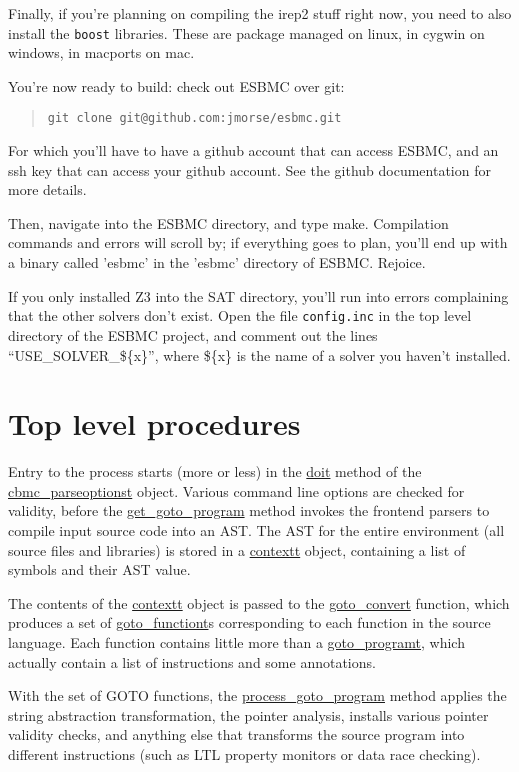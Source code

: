 \documentclass{article}
\begin{document}
Finally, if you're planning on compiling the irep2 stuff right now, you need
to also install the \texttt{boost} libraries. These are package managed on
linux, in cygwin on windows, in macports on mac.

You're now ready to build: check out ESBMC over git:

\begin{quote}
\texttt{git clone git@github.com:jmorse/esbmc.git}
\end{quote}

For which you'll have to have a github account that can access ESBMC, and an
ssh key that can access your github account. See the github documentation for
more details.

Then, navigate into the ESBMC directory, and type make. Compilation
commands and errors will scroll by; if everything goes to plan, you'll end up
with a binary called 'esbmc' in the 'esbmc' directory of ESBMC. Rejoice.

If you only installed Z3 into the SAT directory, you'll run into errors
complaining that the other solvers don't exist. Open the file
\texttt{config.inc} in the top level directory of the ESBMC project, and
comment out the lines ``USE\_SOLVER\_\$\{x\}'', where \$\{x\} is the name of
a solver you haven't installed.

\section{Top level procedures}

Entry to the process starts (more or less) in the \url{doit} method of the
\url{cbmc_parseoptionst} object. Various command line options are checked
for validity, before the \url{get_goto_program} method invokes the
frontend parsers to compile input source code into an AST. The AST for the
entire environment (all source files and libraries) is stored in a
\url{contextt} object, containing a list of symbols and their AST value.

The contents of the \url{contextt} object is passed to the
\url{goto_convert} function, which produces a set of
\url{goto_functiont}s corresponding to each function in the source language.
Each function contains little more than a \url{goto_programt}, which
actually contain a list of instructions and some annotations.

With the set of GOTO functions, the \url{process_goto_program} method
applies the string abstraction transformation, the pointer analysis,
installs various pointer validity checks, and anything else that transforms
the source program into different instructions (such as LTL property monitors
or data race checking).
\end{document}

